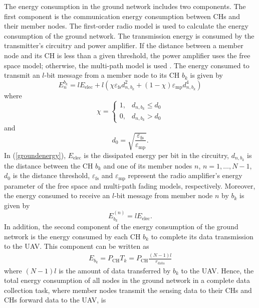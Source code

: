 \documentclass[journal]{IEEEtran}
\begin{document}
	
	
	The energy consumption in the ground network includes two components. The first component is the communication energy consumption between CHs and their member nodes. The first-order radio model \cite{W. R. Heinzelman} is used to calculate the energy consumption of the ground network. The transmission energy is consumed by the transmitter's circuitry and power amplifier. If the distance between a member node and its CH is less than a given threshold, the power amplifier uses the free space model; otherwise, the multi-path model is used \cite{T. Rappaport}. The energy consumed to transmit an $l$-bit message from a member node to its CH $b_k$ is given by \cite{W. R. Heinzelman}
	\begin{equation}
	\label{groundenergy}
	E_{n}^{b_k} = lE_{\text{elec}} + l\left(\chi \varepsilon_\text{fs}d_{n,b_k}^2 + \left(1 - \chi \right) \varepsilon_\text{mp}d_{n,b_k}^4 \right)
	\end{equation}
	where
	\begin{equation}
	\chi = \left\{ \begin{array}{ll}
	1, & d_{n,b_k} \leq d_0 \\
	0, & d_{n,b_k} > d_0
	\end{array} \right.
	\end{equation}
	and
	\begin{equation}
	d_0 = \sqrt{\frac{\varepsilon_\text{fs}}{\varepsilon_\text{mp}}}.
	\end{equation}
	In (\ref{groundenergy}), $E_{\text{elec}}$ is the dissipated energy per bit in the circuitry, $d_{n,b_k}$ is the distance between the CH $b_k$ and one of its member nodes $n$, $n=1,\dots,N-1$, $d_0$ is the distance threshold, $\varepsilon_\text{fs}$ and $\varepsilon_\text{mp}$ represent the radio amplifier's energy parameter of the free space and multi-path fading models, respectively. Moreover, the energy consumed to receive an $l$-bit message from member node $n$ by $b_k$ is given by \cite{W. R. Heinzelman}
	\begin{equation}
	E_{b_k}^{(n)} = lE_{\text{elec}}.
	\end{equation}
	In addition, the second component of the energy consumption of the ground network is the energy consumed by each CH $b_k$ to complete its data transmission to the UAV. This component can be written as
	\begin{eqnarray}
	   E_{b_k} = P_{\text{CH}}T_k = P_{\text{CH}}\frac{(N-1)l}{r_{\text{data}}}
	\end{eqnarray}
	where $(N-1)l$ is the amount of data transferred by $b_k$ to the UAV. Hence, the total energy consumption of all nodes in the ground network in a complete data collection task, where member nodes transmit the sensing data to their CHs and CHs forward data to the UAV, is
	
\end{document}
